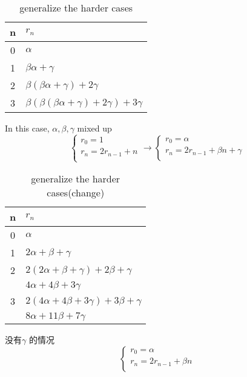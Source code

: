 \documentclass[mode=geye]{elegantnote}
\begin{document}
\begin{table}[htbp]
	\centering
	\small
	\caption{generalize the harder cases}
	\begin{tabular}{cl}
		\toprule
		n & $ r_n $ \\
		\midrule
        0 & $ \alpha $  \\
        1 & $ \beta\alpha+\gamma $  \\
        2 & $ \beta(\beta\alpha+\gamma)+2\gamma $  \\
        3 & $ \beta(\beta(\beta\alpha+\gamma)+2\gamma)+3\gamma $  \\
		\bottomrule
	\end{tabular}%
	\label{tab:casesofharder}%
\end{table}%
In this case, $ \alpha, \beta, \gamma $ mixed up
\begin{equation*}
    \left\{
        \begin{array}{l}
            r_0 = 1\\
            r_n = 2r_{n-1}+n \\
        \end{array}
    \right. \rightarrow
    \left\{
        \begin{array}{l}
            r_0 = \alpha \\
            r_n = 2 r_{n-1} + \beta n + \gamma \\
        \end{array}
    \right.
\end{equation*}
\begin{table}[htbp]
	\centering
	\small
	\caption{generalize the harder cases(change)}
	\begin{tabular}{cl}
		\toprule
		n & $ r_n $ \\
		\midrule
        0 & $ \alpha $  \\
        1 & $ 2\alpha+\beta+\gamma $  \\
        2 & $ 2(2\alpha+\beta+\gamma)+2\beta+\gamma $  \\
          & $ 4\alpha + 4\beta + 3\gamma $ \\
        3 & $ 2(4\alpha + 4\beta + 3\gamma)+3\beta+\gamma $  \\
          & $ 8\alpha + 11\beta + 7\gamma $ \\
		\bottomrule
	\end{tabular}%
	\label{tab:casesofharderChange}%
\end{table}%
没有$ \gamma $ 的情况
\begin{equation*}
    \left\{
        \begin{array}{l}
            r_0 = \alpha\\
            r_n = 2r_{n-1}+\beta n \\
        \end{array}
    \right.
\end{equation*}
\end{document}
